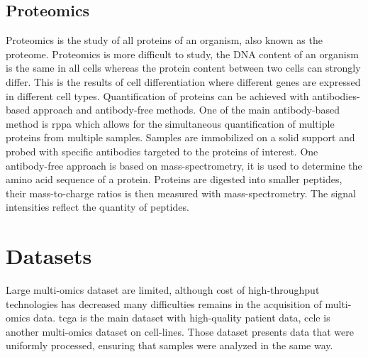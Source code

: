 \documentclass[../main.tex]{subfiles}
\begin{document}
 \subsection{Proteomics}\label{subsec:proteomics}
     Proteomics is the study of all proteins of an organism, also known as the proteome.
     Proteomics is more difficult to study, the DNA content of an organism is the same in all cells whereas the protein content between two cells can strongly differ.
     This is the results of cell differentiation where different genes are expressed in different cell types.
     Quantification of proteins can be achieved with antibodies-based approach and antibody-free methods.
     One of the main antibody-based method is \gls{rppa} which allows for the simultaneous quantification of multiple proteins from multiple samples.
     Samples are immobilized on a solid support and probed with specific antibodies targeted to the proteins of interest.
     One antibody-free approach is based on mass-spectrometry, it is used to determine the amino acid sequence of a protein.
     Proteins are digested into smaller peptides, their mass-to-charge ratios is then measured with mass-spectrometry.
     The signal intensities reflect the quantity of peptides.

\section{Datasets}
 Large multi-omics dataset are limited, although cost of high-throughput technologies has decreased many difficulties remains in the acquisition of multi-omics data.
 \Gls{tcga} is the main dataset with high-quality patient data, \gls{ccle} is another multi-omics dataset on cell-lines.
 Those dataset presents data that were uniformly processed, ensuring that samples were analyzed in the same way.
\end{document}
